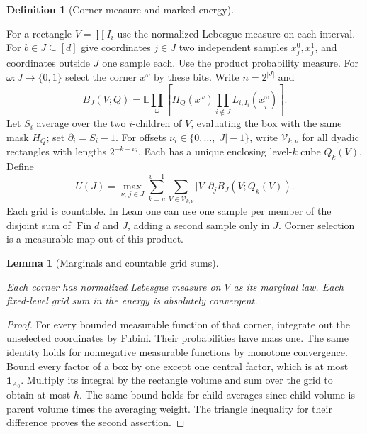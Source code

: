 \documentclass[11pt,letterpaper]{article}
\newtheorem{lemma}[theorem]{Lemma}
\theoremstyle{definition}
\newtheorem{definition}[theorem]{Definition}
\newcommand{\E}{\mathbb E}
\newcommand{\ind}{\mathbf1}
\providecommand{\lean}[1]{}
\providecommand{\uses}[1]{}
\begin{document}
\begin{definition}[Corner measure and marked energy]\label{bp:energy-def}
\lean{TwistedParaproduct.energyDef}
\uses{bp:prune,bp:residual-drift}
For a rectangle \(V=\prod I_i\) use the normalized Lebesgue measure
on each interval. For \(b\in J\subseteq[d]\) give coordinates
\(j\in J\) two independent samples \(x_j^0,x_j^1\), and coordinates
outside \(J\) one sample each. Use the product probability measure.
For \(\omega:J\to\{0,1\}\) select the corner \(x^\omega\) by these bits.
Write \(n=2^{|J|}\) and
\[
 B_J(V;Q)=\E\prod_\omega
        \left[H_Q(x^\omega)\prod_{i\notin J}L_{i,I_i}(x^\omega_{\hat i})\right].
\]
Let \(S_i\) average over the two \(i\)-children of \(V\), evaluating
the box with the same mask \(H_Q\); set \(\partial_i=S_i-1\).
For offsets \(\nu_i\in\{0,\ldots,|J|-1\}\), write \(\mathcal V_{k,\nu}\)
for all dyadic rectangles with lengths \(2^{-k-\nu_i}\). Each has a
unique enclosing level-\(k\) cube \(Q_k(V)\). Define
\[
 U(J)=\max_{\nu,\,j\in J}
 \sum_{k=u}^{v-1}\sum_{V\in\mathcal V_{k,\nu}}
        |V|\,\partial_jB_J(V;Q_k(V)).
\]
Each grid is countable. In Lean one can use one sample per member of the
disjoint sum of \(\operatorname{Fin}d\) and \(J\), adding a second
sample only in \(J\). Corner selection is a measurable map out of this
product.
\end{definition}

\begin{lemma}[Marginals and countable grid sums]\label{bp:marginal}
\lean{TwistedParaproduct.marginal}
Each corner has normalized Lebesgue measure on \(V\) as its marginal
law. Each fixed-level grid sum in the energy is absolutely convergent.
\end{lemma}
\begin{proof}
\uses{bp:energy-def}
For every bounded measurable function of that corner, integrate out
the unselected coordinates by Fubini. Their probabilities have mass
one. The same identity holds for nonnegative measurable functions by
monotone convergence. Bound every factor of a box by one except one
central factor, which is at most \(\ind_{A_0}\). Multiply its integral
by the rectangle volume and sum over the grid to obtain at most \(h\).
The same bound holds for child averages since child volume is parent
volume times the averaging weight. The triangle inequality for their
difference proves the second assertion.
\end{proof}
\end{document}
